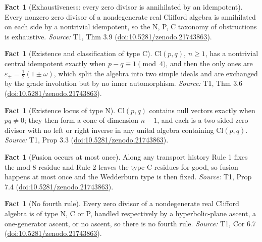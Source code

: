 \documentclass[11pt]{article}
\theoremstyle{definition}
\newtheorem{fact}[theorem]{Fact}
\theoremstyle{plain}
\providecommand{\Cl}{}\renewcommand{\Cl}{\mathrm{Cl}}
\begin{document}
\begin{fact}[Exhaustiveness: every zero divisor is annihilated by an idempotent]\label{c:transport.exhaustiveness-every-zero-divisor-annihilated-idempotent}
Every nonzero zero divisor of a nondegenerate real Clifford algebra is annihilated on each side by a nontrivial idempotent, so the N, P, C taxonomy of obstructions is exhaustive.
\emph{Source:} T1, Thm 3.9 (\href{https://doi.org/10.5281/zenodo.21743863}{doi:10.5281/zenodo.21743863}).
\end{fact}

\begin{fact}[Existence and classification of type C]\label{c:transport.existence-classification-type-c}
$\Cl(p,q)$, $n \geq 1$, has a nontrivial central idempotent exactly when $p - q \equiv 1 \pmod 4$, and then the only ones are $\varepsilon_\pm = \tfrac12(1 \pm \omega)$, which split the algebra into two simple ideals and are exchanged by the grade involution but by no inner automorphism.
\emph{Source:} T1, Thm 3.6 (\href{https://doi.org/10.5281/zenodo.21743863}{doi:10.5281/zenodo.21743863}).
\end{fact}

\begin{fact}[Existence locus of type N]\label{c:transport.existence-locus-type-n}
$\Cl(p,q)$ contains null vectors exactly when $pq \neq 0$; they then form a cone of dimension $n - 1$, and each is a two-sided zero divisor with no left or right inverse in any unital algebra containing $\Cl(p,q)$.
\emph{Source:} T1, Prop 3.3 (\href{https://doi.org/10.5281/zenodo.21743863}{doi:10.5281/zenodo.21743863}).
\end{fact}

\begin{fact}[Fusion occurs at most once]\label{c:transport.fusion-occurs-most-once}
Along any transport history Rule 1 fixes the mod-8 residue and Rule 2 leaves the type-C residues for good, so fusion happens at most once and the Wedderburn type is then fixed.
\emph{Source:} T1, Prop 7.4 (\href{https://doi.org/10.5281/zenodo.21743863}{doi:10.5281/zenodo.21743863}).
\end{fact}

\begin{fact}[No fourth rule]\label{c:transport.no-fourth-rule}
Every zero divisor of a nondegenerate real Clifford algebra is of type N, C or P, handled respectively by a hyperbolic-plane ascent, a one-generator ascent, or no ascent, so there is no fourth rule.
\emph{Source:} T1, Cor 6.7 (\href{https://doi.org/10.5281/zenodo.21743863}{doi:10.5281/zenodo.21743863}).
\end{fact}
\end{document}
